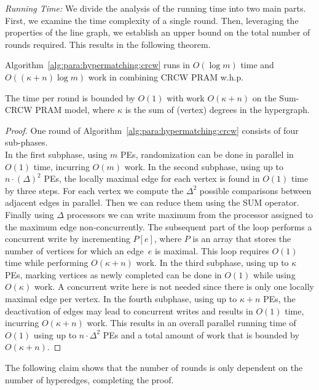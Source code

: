 \documentclass[runningheads]{llncs}
\begin{document}
\textit{Running Time:} We divide the analysis of the running time into two main parts. First, we examine the time complexity of a single round. Then, leveraging the properties of the line graph, we establish an upper bound on the total number of rounds required.  This results in the following theorem.
\begin{theorem}
        Algorithm~\ref{alg:para:hypermatching:crcw} runs in $O(\log{m})$ time and \hbox{$O((\kappa + n) \log{m})$} work in combining CRCW PRAM \hbox{w.h.p.}
\end{theorem}
\begin{claim}\label{thrm:crcw:work_per_round}
        The time per round is bounded by $O(1)$ with work $O(\kappa+n)$ on the Sum-CRCW PRAM model, where $\kappa$ is the sum of  (vertex) degrees in the hypergraph.
\end{claim}

\begin{proof}
 One round of Algorithm~\ref{alg:para:hypermatching:crcw} consists of four sub-phases. \\
 In the first subphase, using $m$ PEs, randomization can be done in parallel in $O(1)$ time, incurring $O(m)$ work. 
 In the second subphase, using up to  $n\cdot (\Delta)^2$ PEs, the locally maximal edge for each vertex is found in $O(1)$ time by three steps. 
 For each vertex we compute the $\Delta^2$ possible comparisons between adjacent edges in parallel. Then we can reduce them using the SUM operator. Finally using $\Delta$ processors we can write maximum from the processor assigned to the maximum edge non-concurrently.
 The subsequent part of the loop performs a concurrent write by incrementing $P[e]$, where $P$ is an array that stores the number of vertices for which an edge~$e$ is maximal. This loop requires $O(1)$ time while performing $O(\kappa + n)$ work.
 In the third subphase, using up to $\kappa$ PEs, marking vertices as newly completed can be done in $O(1)$ while using $O(\kappa)$ work. A concurrent write here is not needed since there is only one locally maximal edge per vertex.
 In the fourth subphase, using up to $\kappa + n$ PEs, the deactivation of edges may lead to concurrent writes and results in $O(1)$ time, incurring $O(\kappa + n)$ work.
 This results in an overall parallel running time of $O(1)$ using up to $n\cdot \Delta^2$ PEs and a total amount of work that is bounded by $O(\kappa + n)$.
\end{proof}

The following claim shows that the number of rounds is only dependent on the number of hyperedges, completing the proof. %
\end{document}
